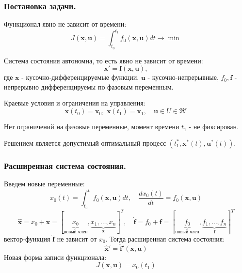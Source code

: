 
\subsubsection{Постановка задачи.}

Функционал явно не зависит от времени:
\begin{equation*}
	J(\mathbf{x},\mathbf{u})=\int_{t_0}^{t_1}f_0(\mathbf{x},\mathbf{u}) dt\to\min
\end{equation*}

Система состояния автономна, то есть явно не зависит от времени:
\begin{equation*}
	\mathbf{x}'=\mathbf{f}(\mathbf{x},\mathbf{u}),
\end{equation*}
где $\mathbf{x}$ - кусочно-дифференцируемые функции, $\mathbf{u}$ - кусочно-непрерывные, $f_0, \mathbf{f}$ - непрерывно дифференцируемы по фазовым переменным.

Краевые условия и ограничения на управления:
\begin{equation*}
	\mathbf{x}(t_0)=\mathbf{x}_0,\; \mathbf{x}(t_1) = \mathbf{x}_1,\quad
	\mathbf{u} \in U \in \mathfrak{R}^r
\end{equation*}

Нет ограничений на фазовые переменные, момент времени $t_1$ - не фиксирован.

Решением является допустимый оптимальный процесс $\left(t^*_1,\mathbf{x}^*(t), \mathbf{u}^*(t)\right)$.

\subsubsection{Расширенная система состояния.}
Введем новые переменные:
\begin{equation*}
	x_0(t)=\int_{t_0}^{t} f_0(\mathbf{x},\mathbf{u}) dt,\quad \frac{dx_0(t)}{dt}=f_0(\mathbf{x},\mathbf{u})
\end{equation*}
\begin{equation*}
	\hat{\mathbf{x}} = x_0 + \mathbf{x} = \left[\underbrace{x_0}_{\text{новый член}}, \underbrace{x_1, \dots, x_n}_{\mathbf{x}}\right]^T,\quad
	\hat{\mathbf{f}} = f_0 + \mathbf{f} = \left[\underbrace{f_0}_{\text{новый член}}, \underbrace{f_1, \dots, f_n}_{\mathbf{f}}\right]^T
\end{equation*}
вектор-функция $\hat{\mathbf{f}}$ не зависит от $x_0$.
Тогда расширенная система состояния:
\begin{equation*}
	\hat{\mathbf{x}}'=\hat{\mathbf{f}}'(\mathbf{x},\mathbf{u})
\end{equation*}
Новая форма записи функционала:
\begin{equation*}
	J(\mathbf{x},\mathbf{u}) = x_0(t_1)
\end{equation*}

